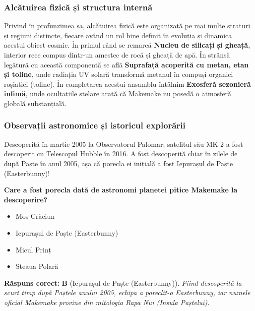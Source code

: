 \subsubsection*{Alcătuirea fizică și structura internă}
Privind în profunzimea sa, alcătuirea fizică este organizată pe mai multe straturi și regiuni distincte, fiecare având un rol bine definit în evoluția și dinamica acestui obiect cosmic. În primul rând se remarcă \textbf{Nucleu de silicați și gheață}, interior rece compus dintr-un amestec de rocă și gheață de apă. În strânsă legătură cu această componentă se află \textbf{Suprafață acoperită cu metan, etan și toline}, unde radiația UV solară transformă metanul în compuși organici roșiatici (toline). În completarea acestui ansamblu întâlnim \textbf{Exosferă sezonieră infimă}, unde ocultațiile stelare arată că Makemake nu posedă o atmosferă globală substanțială.

\subsubsection*{Observații astronomice și istoricul explorării}
Descoperită în martie 2005 la Observatorul Palomar; satelitul său MK 2 a fost descoperit cu Telescopul Hubble în 2016. A fost descoperită chiar în zilele de după Paște în anul 2005, așa că porecla ei inițială a fost \guillemotleft{}Iepurașul de Paște\guillemotright{} (Easterbunny)!

\vspace{6pt}
\begin{tcolorbox}[orbitarquiz, title={\textbf{Întrebare de verificare \#36: Makemake}}]
\textbf{Care a fost porecla dată de astronomi planetei pitice Makemake la descoperire?}
\begin{itemize}[leftmargin=2.2em, itemsep=2pt, topsep=4pt]
  \item[$\square$ \textbf{A.}] Moș Crăciun
  \item[$\square$ \textbf{B.}] Iepurașul de Paște (Easterbunny)
  \item[$\square$ \textbf{C.}] Micul Prinț
  \item[$\square$ \textbf{D.}] Steaua Polară
\end{itemize}
\vspace{2pt}
{\footnotesize\color{orbitarMuted}\textbf{Răspuns corect:} \textbf{B} (Iepurașul de Paște (Easterbunny)). \emph{Fiind descoperită la scurt timp după Paștele anului 2005, echipa a poreclit-o \guillemotleft{}Easterbunny\guillemotright{}, iar numele oficial Makemake provine din mitologia Rapa Nui (Insula Paștelui).}}
\end{tcolorbox}
\clearpage


